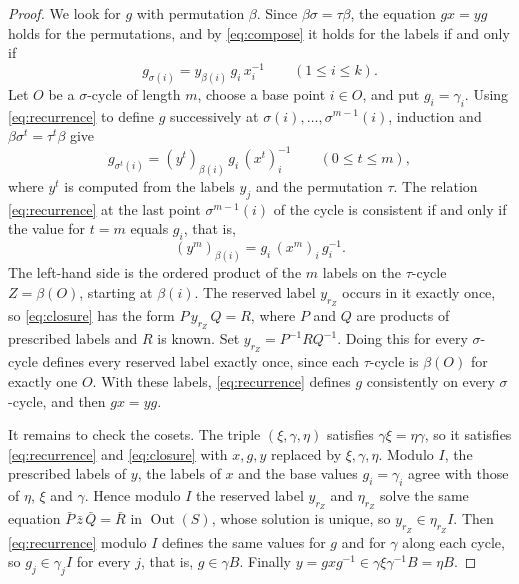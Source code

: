 \documentclass[11pt,colorlinks]{charlie}
\DeclareMathOperator{\Out}{Out}
\begin{document}
\begin{proof}
We look for $g$ with permutation $\beta$. Since $\beta\sigma=\tau\beta$, the equation $gx=yg$ holds for the permutations, and by \eqref{eq:compose} it holds for the labels if and only if
\begin{equation}\label{eq:recurrence}
 g_{\sigma(i)}=y_{\beta(i)}\,g_i\,x_i^{-1}\qquad(1\le i\le k).
\end{equation}
Let $O$ be a $\sigma$-cycle of length $m$, choose a base point $i\in O$, and put $g_i=\gamma_i$. Using \eqref{eq:recurrence} to define $g$ successively at $\sigma(i),\dots,\sigma^{m-1}(i)$, induction and $\beta\sigma^t=\tau^t\beta$ give
\[
 g_{\sigma^t(i)}=(y^t)_{\beta(i)}\,g_i\,(x^t)_i^{-1}\qquad(0\le t\le m),
\]
where $y^t$ is computed from the labels $y_j$ and the permutation $\tau$. The relation \eqref{eq:recurrence} at the last point $\sigma^{m-1}(i)$ of the cycle is consistent if and only if the value for $t=m$ equals $g_i$, that is,
\begin{equation}\label{eq:closure}
 (y^m)_{\beta(i)}=g_i\,(x^m)_i\,g_i^{-1}.
\end{equation}
The left-hand side is the ordered product of the $m$ labels on the $\tau$-cycle $Z=\beta(O)$, starting at $\beta(i)$. The reserved label $y_{r_Z}$ occurs in it exactly once, so \eqref{eq:closure} has the form $P\,y_{r_Z}\,Q=R$, where $P$ and $Q$ are products of prescribed labels and $R$ is known. Set $y_{r_Z}=P^{-1}RQ^{-1}$. Doing this for every $\sigma$-cycle defines every reserved label exactly once, since each $\tau$-cycle is $\beta(O)$ for exactly one $O$. With these labels, \eqref{eq:recurrence} defines $g$ consistently on every $\sigma$-cycle, and then $gx=yg$.

It remains to check the cosets. The triple $(\xi,\gamma,\eta)$ satisfies $\gamma\xi=\eta\gamma$, so it satisfies \eqref{eq:recurrence} and \eqref{eq:closure} with $x,g,y$ replaced by $\xi,\gamma,\eta$. Modulo $I$, the prescribed labels of $y$, the labels of $x$ and the base values $g_i=\gamma_i$ agree with those of $\eta$, $\xi$ and $\gamma$. Hence modulo $I$ the reserved label $y_{r_Z}$ and $\eta_{r_Z}$ solve the same equation $\bar P\,\bar z\,\bar Q=\bar R$ in $\Out(S)$, whose solution is unique, so $y_{r_Z}\in\eta_{r_Z}I$. Then \eqref{eq:recurrence} modulo $I$ defines the same values for $g$ and for $\gamma$ along each cycle, so $g_j\in\gamma_jI$ for every $j$, that is, $g\in\gamma B$. Finally $y=gxg^{-1}\in\gamma\xi\gamma^{-1}B=\eta B$.
\end{proof}
\end{document}
